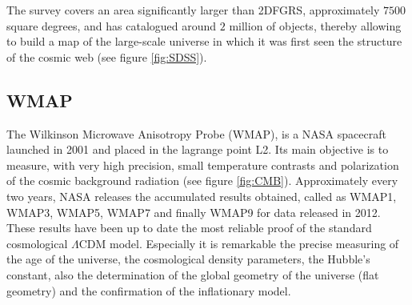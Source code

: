 The survey covers an area significantly larger than 2DFGRS, 
approximately $7500$ square degrees, and has catalogued around $2$ million
of objects, thereby allowing to build a map of the large-scale universe in 
which it was first seen the structure of the cosmic web (see figure 
\ref{fig:SDSS}).


	
	\subsection*{WMAP}
	\label{subsec:WMAP}


The Wilkinson Microwave Anisotropy Probe (WMAP), is a NASA spacecraft 
launched in 2001 and placed in the lagrange point L2. Its main objective
is to measure, with very high precision, small temperature contrasts and 
polarization of the cosmic background radiation (see figure \ref{fig:CMB}).
Approximately every two years, NASA releases the accumulated results 
obtained, called as WMAP1, WMAP3, WMAP5, WMAP7 and finally WMAP9 for data 
released in 2012. These results have been up to date the most reliable 
proof of the standard cosmological $\Lambda$CDM model. Especially it is
remarkable the precise measuring of the age of the universe, the 
cosmological density parameters, the Hubble's constant, also the 
determination of the global geometry of the universe (flat geometry) and
the confirmation of the inflationary model.


